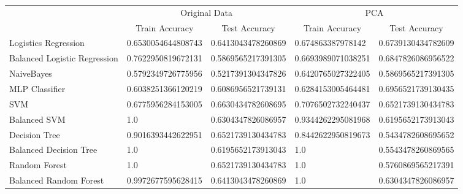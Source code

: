 \documentclass{article}
\begin{document}
\begin{table}[]
\begin{tabular}{l|ll|ll|}
\cline{2-5}
                                                   & \multicolumn{2}{c|}{Original Data}                                           & \multicolumn{2}{c|}{PCA}                                                     \\ \cline{2-5} 
                                                   & \multicolumn{1}{c|}{Train Accuracy}     & \multicolumn{1}{c|}{Test Accuracy} & \multicolumn{1}{c|}{Train Accuracy}     & \multicolumn{1}{c|}{Test Accuracy} \\ \hline
\multicolumn{1}{|l|}{Logistics Regression}         & \multicolumn{1}{l|}{0.6530054644808743} & 0.6413043478260869                 & \multicolumn{1}{l|}{0.674863387978142}  & 0.6739130434782609                 \\ \hline
\multicolumn{1}{|l|}{Balanced Logistic Regression} & \multicolumn{1}{l|}{0.7622950819672131} & 0.5869565217391305                 & \multicolumn{1}{l|}{0.6693989071038251} & 0.6847826086956522                 \\ \hline
\multicolumn{1}{|l|}{NaiveBayes}                   & \multicolumn{1}{l|}{0.5792349726775956} & 0.5217391304347826                 & \multicolumn{1}{l|}{0.6420765027322405} & 0.5869565217391305                 \\ \hline
\multicolumn{1}{|l|}{MLP Classifier}               & \multicolumn{1}{l|}{0.6038251366120219} & 0.6086956521739131                 & \multicolumn{1}{l|}{0.6284153005464481} & 0.6956521739130435                 \\ \hline
\multicolumn{1}{|l|}{SVM}                          & \multicolumn{1}{l|}{0.6775956284153005} & 0.6630434782608695                 & \multicolumn{1}{l|}{0.7076502732240437} & 0.6521739130434783                 \\ \hline
\multicolumn{1}{|l|}{Balanced SVM}                 & \multicolumn{1}{l|}{1.0}                & 0.6304347826086957                 & \multicolumn{1}{l|}{0.9344262295081968} & 0.6195652173913043                 \\ \hline
\multicolumn{1}{|l|}{Decision Tree}                & \multicolumn{1}{l|}{0.9016393442622951} & 0.6521739130434783                 & \multicolumn{1}{l|}{0.8442622950819673} & 0.5434782608695652                 \\ \hline
\multicolumn{1}{|l|}{Balanced Decision Tree}       & \multicolumn{1}{l|}{1.0}                & 0.6195652173913043                 & \multicolumn{1}{l|}{1.0}                & 0.5543478260869565                 \\ \hline
\multicolumn{1}{|l|}{Random Forest}                & \multicolumn{1}{l|}{1.0}                & 0.6521739130434783                 & \multicolumn{1}{l|}{1.0}                & 0.5760869565217391                 \\ \hline
\multicolumn{1}{|l|}{Balanced Random Forest}       & \multicolumn{1}{l|}{0.9972677595628415} & 0.6413043478260869                 & \multicolumn{1}{l|}{1.0}                & 0.6304347826086957                 \\ \hline
\end{tabular}
\end{table}
\end{document}
